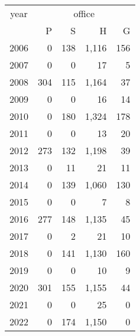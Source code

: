 \footnotesize\begin{tabular}[t]{lrrrr}
\toprule
\multicolumn{1}{c}{year} & \multicolumn{4}{c}{office} \\
\cmidrule(l{3pt}r{3pt}){1-1} \cmidrule(l{3pt}r{3pt}){2-5}
  & P & S & H & G\\
\midrule
2006 & 0 & 138 & 1,116 & 156\\
2007 & 0 & 0 & 17 & 5\\
2008 & 304 & 115 & 1,164 & 37\\
2009 & 0 & 0 & 16 & 14\\
2010 & 0 & 180 & 1,324 & 178\\
2011 & 0 & 0 & 13 & 20\\
2012 & 273 & 132 & 1,198 & 39\\
2013 & 0 & 11 & 21 & 11\\
2014 & 0 & 139 & 1,060 & 130\\
2015 & 0 & 0 & 7 & 8\\
2016 & 277 & 148 & 1,135 & 45\\
2017 & 0 & 2 & 21 & 10\\
2018 & 0 & 141 & 1,130 & 160\\
2019 & 0 & 0 & 10 & 9\\
2020 & 301 & 155 & 1,155 & 44\\
2021 & 0 & 0 & 25 & 0\\
2022 & 0 & 174 & 1,150 & 0\\
\bottomrule
\end{tabular}
